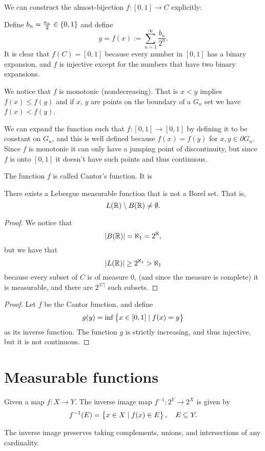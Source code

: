 \documentclass[11pt,a4paper]{article}
\begin{document}
We can construct the almost-bijection $f \colon [0,1] \to C$ explicitly:

Define $b_n = \frac{a_n}{2} \in \set{0,1}$ and define
\[
    y = f(x) := \sum_{n=1}^{\infty} \frac{b_n}{2^n}.
\]
It is clear that $f(C) = [0,1]$ because every number in $[0,1]$ has a binary
expansion, and $f$ is injective except for the numbers that have two
binary expansions.

We notice that $f$ is monotonic (nondecreasing).
That is $x < y$ implies $f(x) \le f(y)$ and if $x$, $y$ are points
on the boundary of a $G_n$ set we have $f(x) < f(y)$.

We can expand the function such that $f \colon [0,1] \to [0,1]$ by
defining it to be constant on $G_n$, and this is well defined because
$f(x) = f(y)$ for $x,y \in \partial G_n$.
Since $f$ is monotonic it can only have a jumping point of discontinuity,
but since $f$ is onto $[0,1]$ it doesn't have such points and thus continuous.

The function $f$ is called Cantor's function.
It is 

\begin{proposition}
  There exists a Lebesgue measurable function that is not a Borel set.
  That is,
  \[
    L(\mathbb{R}) \setminus B(\mathbb{R}) \neq \emptyset.
  \]
\end{proposition}
\begin{proof}
  We notice that
  \[
    |B(\mathbb{R})| = \aleph_1 = 2^{\aleph},
  \]
  but we have that
  \[
    |L(\mathbb{R})| \geq 2^{\aleph_1} > \aleph_1
  \]
  because every subset of $C$ is of measure $0$, (and since the measure
  is complete) it is measurable, and there are $2^{|C|}$ such subsets.
\end{proof}
\begin{proof}
  Let $f$ be the Cantor function, and define
  \[
    g(y) = \inf\set{x \in [0,1] \mid f(x) = y}
  \]
  as its inverse function.
  The function $g$ is strictly increasing, and thus injective, 
  but it is not continuous.
\end{proof}

\section{Measurable functions}
\begin{definition}
  Given a map $f \colon X \to Y$.
  The inverse image map $f^{-1} \colon 2^{Y} \to 2^{X}$ is given by
  \[
    f^{-1}(E) = \set{x \in X \mid f(x) \in E}, \quad E \subseteq Y.
  \]
\end{definition}
\begin{remark}
  The inverse image preserves taking complements, unions, and intersections
  of any cardinality.
\end{remark}
\end{document}
